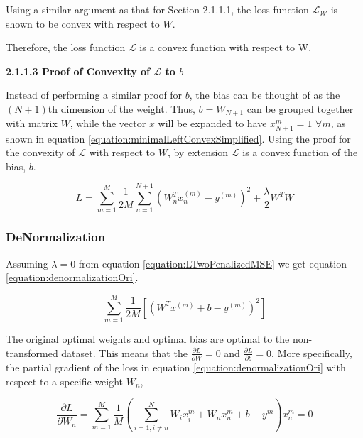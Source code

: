 \documentclass[a4paper,12pt]{article}
\begin{document}
Using a similar argument as that for Section 2.1.1.1, the loss function $\mathcal{L_W}$ is shown to be convex with respect to $W$. 

Therefore, the loss function $\mathcal{L}$ is a convex function with respect to W. 

\textbf{2.1.1.3 Proof of Convexity of $\mathcal{L}$ to $b$}

Instead of performing a similar proof for $b$, the bias can be thought of as the $(N+1)$th dimension of the weight. Thus, $b = W_{N+1}$ can be grouped together with matrix $W$, while the vector $x$ will be expanded to have $x_{N+1}^{m} = 1$  $\forall m$, as shown in equation \ref{equation:minimalLeftConvexSimplified}. 
Using the proof for the convexity of $\mathcal{L}$ with respect to $W$, by extension $\mathcal{L}$ is a convex function of the bias, $b$.

\begin{equation}
\label{equation:minimalLeftConvexSimplified}
L = \sum_{m=1}^{M} \frac{1}{2M} \sum_{n=1}^{N+1} \left( W^{T}_{n}x^{(m)}_{n} - y^{(m)}\right)^{2} + \frac{\lambda}{2} W^{T}W 
\end{equation}

\clearpage
\subsubsection{DeNormalization}

Assuming $\lambda = 0$ from equation \ref{equation:LTwoPenalizedMSE} we get equation \ref{equation:denormalizationOri}. 

\begin{equation}
\label{equation:denormalizationOri}
\sum_{m=1}^{M} \frac{1}{2M} \left[(W^{T}x^{(m)} + b - y^{(m)})^{2}\right] 
\end{equation}


The original optimal weights and optimal bias are optimal to the non-transformed dataset. This means that the 
$\frac{\partial L}{\partial W} = 0$ and $\frac{\partial L}{\partial b} = 0$. More specifically, the partial gradient of the loss in equation \ref{equation:denormalizationOri} with respect to a specific weight $W_{n}$, 

\begin{equation}
\label{equation:partialLossOriW}
\frac{\partial L}{\partial W_{n}} = \sum_{m=1}^{M} \frac{1}{M} (\sum_{i = 1, i  \neq n}^{N}W_{i}x_{i}^{m} + W_{n}x_{n}^{m} + b - y^{m})x_{n}^{m} = 0
\end{equation}
\end{document}
